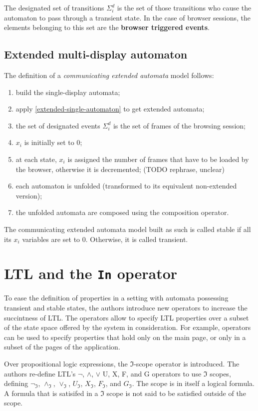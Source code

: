 \documentclass[a4paper,10pt]{article}
\theoremstyle{plain} %
\theoremstyle{definition}
\theoremstyle{remark}
\begin{document}
The designated set of transitions $\Sigma^d_i$ is the set of those transitions who cause the automaton to pass through a transient state. In the case of browser sessions, the elements belonging to this set are the \textbf{browser triggered events}.

\subsection{Extended multi-display automaton}

The definition of a \textit{communicating extended automata} model follows:

\begin{enumerate}
  \item build the single-display automata;
  \item apply \cref{extended-single-automaton} to get extended automata;
  \item the set of designated events $\Sigma^d_i$ is the set of frames of the browsing session;
  \item $x_i$ is initially set to 0;
  \item at each state, $x_i$ is assigned the number of frames that have to be loaded by the browser, otherwise it is decremented; (TODO rephrase, unclear)
  \item each automaton is unfolded (transformed to its equivalent non-extended version);
  \item the unfolded automata are composed using the composition operator.
\end{enumerate}

The communicating extended automata model built as such is called stable if all its $x_i$ variables are set to 0. Otherwise, it is called transient.

\section{LTL and the \textbf{\texttt{In}} operator}

To ease the definition of properties in a setting with automata possessing transient and stable states, the authors introduce new operators to increase the succintness of LTL. The operators allow to specify LTL properties over a subset of the state space offered by the system in consideration. For example, operators can be used to specify properties that hold only on the main page, or only in a subset of the pages of the application.

Over propositional logic expressions, the $\mathcal{\Im}$-scope operator is introduced. The authors re-define LTL's $\neg$, $\land$, $\lor$ U, X, F, and G operators to use $\mathcal{\Im}$ scopes, defining $\neg_{\mathcal{\Im}}$, $\land_{\mathcal{\Im}}$, $\lor_{\mathcal{\Im}}$, $U_{\mathcal{\Im}}$, $X_{\mathcal{\Im}}$, $F_{\mathcal{\Im}}$, and $G_{\mathcal{\Im}}$. The scope is in itself a logical formula. A formula that is satisifed in a $\Im$ scope is not said to be satisfied outside of the scope.
\end{document}
